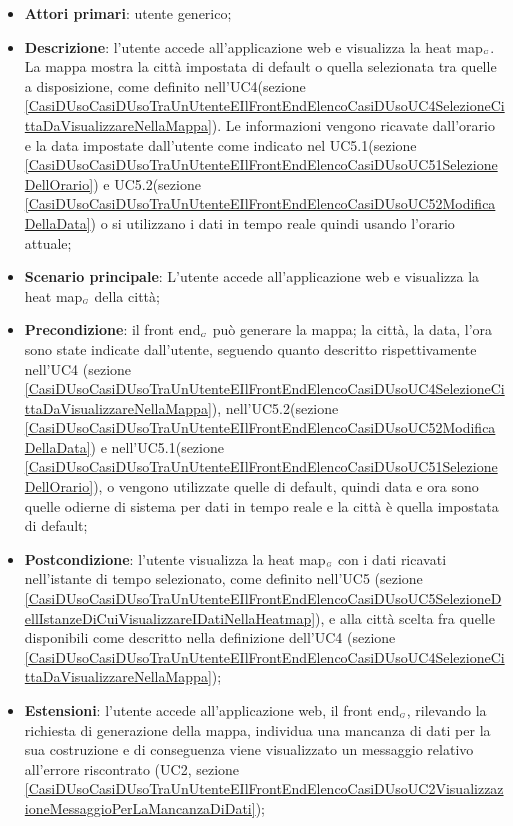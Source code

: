 \begin{itemize}
	\item \textbf{Attori primari}: utente generico;
	\item \textbf{Descrizione}: l’utente accede all’applicazione web e visualizza la heat map$_{\scaleto{G}{3pt}}$. La mappa mostra la città impostata di default o quella selezionata tra quelle a disposizione, come definito nell’UC4(sezione \ref{CasiDUsoCasiDUsoTraUnUtenteEIlFrontEndElencoCasiDUsoUC4SelezioneCittaDaVisualizzareNellaMappa}). Le informazioni vengono ricavate dall’orario e la data impostate dall’utente come indicato nel UC5.1(sezione \ref{CasiDUsoCasiDUsoTraUnUtenteEIlFrontEndElencoCasiDUsoUC51SelezioneDellOrario}) e UC5.2(sezione \ref{CasiDUsoCasiDUsoTraUnUtenteEIlFrontEndElencoCasiDUsoUC52ModificaDellaData}) o si utilizzano i dati in tempo reale quindi usando l’orario attuale;
	\item \textbf{Scenario principale}: L’utente accede all’applicazione web e visualizza la heat map$_{\scaleto{G}{3pt}}$ della città;
	\item \textbf{Precondizione}: il front end$_{\scaleto{G}{3pt}}$ può generare la mappa; la città, la data, l’ora sono state indicate dall’utente, seguendo quanto descritto rispettivamente nell'UC4 (sezione \ref{CasiDUsoCasiDUsoTraUnUtenteEIlFrontEndElencoCasiDUsoUC4SelezioneCittaDaVisualizzareNellaMappa}), nell'UC5.2(sezione \ref{CasiDUsoCasiDUsoTraUnUtenteEIlFrontEndElencoCasiDUsoUC52ModificaDellaData}) e nell'UC5.1(sezione \ref{CasiDUsoCasiDUsoTraUnUtenteEIlFrontEndElencoCasiDUsoUC51SelezioneDellOrario}), o vengono utilizzate quelle di default, quindi data e ora sono quelle odierne di sistema per dati in tempo reale e la città è quella impostata di default;
	\item \textbf{Postcondizione}: l’utente visualizza la heat map$_{\scaleto{G}{3pt}}$ con i dati ricavati nell’istante di tempo selezionato, come definito nell’UC5 (sezione \ref{CasiDUsoCasiDUsoTraUnUtenteEIlFrontEndElencoCasiDUsoUC5SelezioneDellIstanzeDiCuiVisualizzareIDatiNellaHeatmap}), e alla città scelta fra quelle disponibili come descritto nella definizione dell’UC4 (sezione \ref{CasiDUsoCasiDUsoTraUnUtenteEIlFrontEndElencoCasiDUsoUC4SelezioneCittaDaVisualizzareNellaMappa});
	\item \textbf{Estensioni}: l’utente accede all’applicazione web, il front end$_{\scaleto{G}{3pt}}$, rilevando la richiesta di generazione della mappa, individua una mancanza di dati per la sua costruzione e di conseguenza viene visualizzato un messaggio relativo all’errore riscontrato (UC2, sezione \ref{CasiDUsoCasiDUsoTraUnUtenteEIlFrontEndElencoCasiDUsoUC2VisualizzazioneMessaggioPerLaMancanzaDiDati});
\end{itemize}

